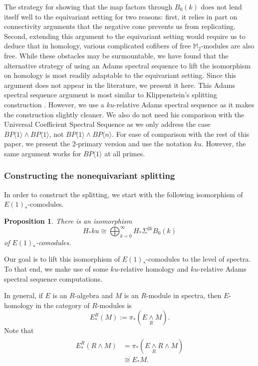 \documentclass{amsart}
\newtheorem{proposition}[equation]{Proposition}
\theoremstyle{plain}
\numberwithin{equation}{section}
\numberwithin{figure}{section}
\newcommand{\mM}{{\mathbb M}}
\newcommand{\0}{\langle 0 \rangle }
\newcommand{\one}{\langle 1 \rangle }
\begin{document}
The strategy for showing that the map factors through $B_{0}(k)$ does not lend itself well to the equivariant setting for two reasons: first, it relies in part on connectivity arguments that the negative cone prevents us from replicating. Second, extending this argument to the equivariant setting would require us to deduce that in homology, various complicated cofibers of free $\mM_{2}$-modules are also free. While these obstacles may be surmountable, we have found that the alternative strategy of using an Adams spectral sequence to lift the isomorphism on homology is most readily adaptable to the equivariant setting. Since this argument does not appear in the literature, we present it here. This Adams spectral sequence argument is most similar to Klippenstein's splitting construction \cite{klippenstein_splitting}. However, we use a $ku$-relative Adams spectral sequence as it makes the construction slightly cleaner. We also do not need his comparison with the Universal Coefficient Spectral Sequence as we only address the case $BP \one \wedge BP\one$, not $BP \one \wedge BP\langle n \rangle $. For ease of comparison with the rest of this paper, we present the $2$-primary version and use the notation $ku$. However, the same argument works for $BP\one$ at all primes.  

\subsubsection{Constructing the nonequivariant splitting}
In order to construct the splitting, we start with the following isomorphism of $E(1)_{*}$-comodules. 
\begin{proposition}\cite[Section~12]{kane1981operations}\cite[Section~4.1] {CulverOddp20}\label{nonequiv: homology splitting} There is an isomorphism 
   \[H_{*}ku \cong \bigoplus_{k=0}^{\infty}H_{*}\Sigma^{2k}B_{0}(k)\]
   of $E(1)_{*}$-comodules.
\end{proposition}
Our goal is to lift this isomorphism of $E(1)_*$-comodules to the level of spectra. To that end, we make use of some $ku$-relative homology and $ku$-relative Adams spectral sequence computations. 

In general, if $E$ is an $R$-algebra and $M$ is an $R$-module in spectra, then $E$-homology in the category of $R$-modules is 
\begin{equation*}
    E_*^R (M) := \pi_{*} (E \underset{R}{\wedge} M).
\end{equation*}
Note that
\begin{align}\label{nonequiv: R's cancel}
\begin{split}
     E^R_*(R \wedge M) & = \pi_*(E \underset{R}{\wedge} R \wedge M) \\
    & \cong E_{*}M.
\end{split}
\end{align}
\end{document}
